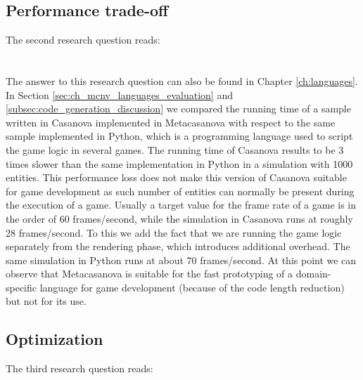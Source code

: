 \subsection{Performance trade-off}
\label{subsec:ch_conclusion_rq2}
The second research question reads:\\\\
\\

The answer to this research question can also be found in Chapter \ref{ch:languages}. In Section  \ref{sec:ch_mcnv_languages_evaluation} and \ref{subsec:code_generation_discussion} we compared the running time of a sample written in Casanova implemented in Metacasanova with respect to the same sample implemented in Python, which is a programming language used to script the game logic in several games. The running time of Casanova results to be 3 times slower than the same implementation in Python in a simulation with 1000 entities. This performance loss does not make this version of Casanova suitable for game development as such number of entities can normally be present during the execution of a game. Usually a target value for the frame rate of a game is in the order of 60 frames/second, while the simulation in Casanova runs at roughly 28 frames/second. To this we add the fact that we are running the game logic separately from the rendering phase, which introduces additional overhead. The same simulation in Python runs at about 70 frames/second. At this point we can observe that Metacasanova is suitable for the fast prototyping of a domain-specific language for game development (because of the code length reduction) but not for its use.

\subsection{Optimization}
\label{subsec:ch_conclusion_rq3}
The third research question reads:\\\\

